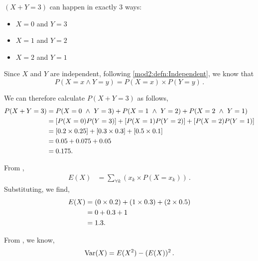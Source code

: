 \begin{subquestions}
\begin{subsubquestions}
\subsubquestion

$(X+Y=3)$ can happen in exactly 3 ways:
\begin{itemize}
	\item $X = 0$ and $Y = 3$
	\item $X = 1$ and $Y = 2$
	\item $X = 2$ and $Y = 1$
\end{itemize}

Since $X$ and $Y$ are independent, following \ref{mod2:defn:Independent}, we know that
\begin{equation}
	P(X=x \land Y=y) = P(X=x) \times P(Y=y)\,.
\end{equation}

We can therefore calculate $P(X+Y=3)$ as follows,
\begin{align}
	P(X+Y=3) & = P(X=0 ~\land~ Y=3) + P(X=1 ~\land~ Y=2) + P(X=2 ~\land~ Y=1) \nonumber \\
	         & = [P(X=0)  P(Y=3)] + [P(X=1)  P(Y=2)] + [P(X=2)  P(Y=1)] \nonumber \\
	         & = [0.2 \times 0.25] + [0.3 \times 0.3] + [0.5 \times 0.1] \nonumber \\ 
	         & = 0.05 + 0.075+0.05 \nonumber \\
	         & = 0.175.
\end{align}


\subsubquestion

\begin{subsubsubquestions}
	
\subsubsubquestion

From ,
\begin{align}
	E(X) & =  \sum_{\forall k} \left(x_k \times P(X=x_k) \right) \,.
\end{align}
Substituting, we find,
\begin{align}
	E(X) & = (0 \times 0.2)+(1 \times 0.3)+(2 \times 0.5) \nonumber \\
	     & = 0 + 0.3 + 1 \nonumber \\
	     & = 1.3.
\end{align}
	
\subsubsubquestion

From , we know,
\begin{equation}
	\text{Var}(X) = E(X^2) - (E(X))^2 \,.
\end{equation}


\end{subsubsubquestions}
\end{subsubquestions}
\end{subquestions}
